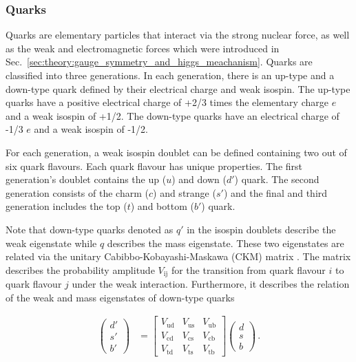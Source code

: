 \documentclass[bachelor,ngerman,english]{GAUBM}
\begin{document}
\subsubsection*{Quarks}
Quarks are elementary particles that interact via the strong nuclear force, as well as the weak and electromagnetic forces which were introduced in Sec.~\ref{sec:theory:gauge_symmetry_and_higgs_meachanism}. Quarks are classified into three generations. In each generation, there is an up-type and a down-type quark defined by their electrical charge and weak isospin. The up-type quarks have a positive electrical charge of +2/3 times the elementary charge $e$ and a weak isospin of +1/2. The down-type quarks have an electrical charge of -1/3 $e$ and a weak isospin of -1/2. 

For each generation, a weak isospin doublet can be defined containing two out of six quark flavours. Each quark flavour has unique properties. The first generation's doublet contains the up ($u$) and down ($d'$) quark. The second generation consists of the charm ($c$) and strange ($s'$) and the final and third generation includes the top ($t$) and bottom ($b'$) quark. %

Note that down-type quarks denoted as $q'$ in the isospin doublets describe the weak eigenstate while $q$ describes the mass eigenstate. These two eigenstates are related via the unitary Cabibbo-Kobayashi-Maskawa (CKM) matrix \cite{theory:ckm_matrix_01,theory:ckm_matrix_02}. The matrix describes the probability amplitude $V_\text{ij}$ for the transition from quark flavour $i$ to quark flavour $j$ under the weak interaction. Furthermore, it describes the relation of the weak and mass eigenstates of down-type quarks

\begin{align}
    \begin{pmatrix}
        d'\\
        s'\\
        b'
    \end{pmatrix} &=
    \begin{bmatrix}
        V_\text{ud} & V_\text{us} & V_\text{ub}\\
        V_\text{cd} & V_\text{cs} & V_\text{cb}\\
        V_\text{td} & V_\text{ts} & V_\text{tb}
    \end{bmatrix}
    \begin{pmatrix}
        d\\
        s\\
        b
    \end{pmatrix}
    \label{eq:down-type_weak_mass_eigentstates}\,.
\end{align}
\end{document}
